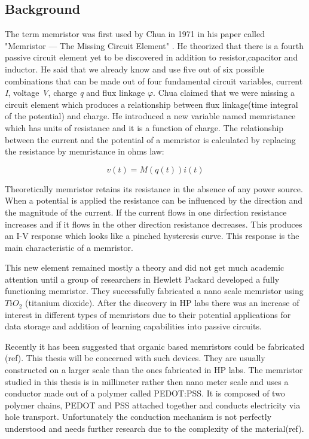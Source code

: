 \begin{doublespace}
\section{Background}
The term memristor was first used by Chua in 1971 in his paper called  "Memristor — The Missing Circuit Element" \cite{chua}. He theorized that there is a fourth passive circuit element yet to be discovered in addition to resistor,capacitor and inductor. He said that we already know and use five out of six possible combinations that can be made out of four fundamental circuit variables, current \textit{I}, voltage \textit{V}, charge \textit{q} and flux linkage \textit{$\varphi$}. Chua claimed that we were missing a circuit element which produces a relationship between flux linkage(time integral of the potential) and charge. He introduced a new variable named memristance which has units of resistance and it is a function of charge. The relationship between the current and the potential of a memristor is calculated by replacing the resistance by memristance in ohms law:


\begin{equation}
v(t)=M(q(t))i(t)
\end{equation}

Theoretically memristor retains its resistance in the absence of any power source. When a potential is applied the resistance can be influenced by the direction and the magnitude of the current. If the current flows in one dirfection resistance increases and if it flows in the other direction resistance decreases. This produces an I-V response which looks like a pinched hysteresis curve. This response is the main characteristic of a memristor. 

This new element remained mostly a theory and did not get much academic attention until a group of researchers in Hewlett Packard developed a fully functioning memristor. They successfully fabricated a nano scale memristor using $TiO_2$ (titanium dioxide). After the discovery in HP labs there was an increase of interest in different types of memristors due to their potential applications for data storage and addition of learning capabilities into passive circuits. 

Recently it has been suggested that organic based memristors could be fabricated (ref). This thesis will be concerned with such devices. They are usually constructed on a larger scale than the ones fabricated in HP labs. The memristor studied in this thesis is in millimeter rather then nano meter scale and uses a conductor made out of a polymer called PEDOT:PSS. It is composed of two polymer chains, PEDOT and PSS attached together and conducts electricity via hole transport. Unfortunately the conduction mechanism is not perfectly understood and needs further research due to the complexity of the material(ref).


\end{doublespace}
